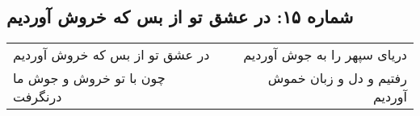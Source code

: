 \begin{center}
\section*{شماره ۱۵: در عشق تو از بس که خروش آوردیم}
\label{sec:015}
\begin{longtable}{l p{0.5cm} r}
در عشق تو از بس که خروش آوردیم
&&
دریای سپهر را به جوش آوردیم
\\
چون با تو خروش و جوش ما درنگرفت
&&
رفتیم و دل و زبان خموش آوردیم
\\
\end{longtable}
\end{center}
